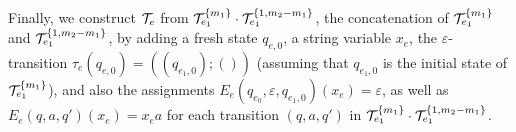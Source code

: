 Finally, we construct $\mathcal{T}_e$ from $\mathcal{T}^{\{m_1\}}_{e_1} \cdot \mathcal{T}^{\{1,m_2-m_1\}}_{e_1}$, the concatenation of $\mathcal{T}^{\{m_1\}}_{e_1}$ and $\mathcal{T}^{\{1,m_2-m_1\}}_{e_1}$, by adding a fresh state $q_{e,0}$, a string variable $x_e$, the $\varepsilon$-transition $\tau_e(q_{e,0}) = ((q_{e_1,0});())$ (assuming that $q_{e_1,0}$ is the initial state of $\mathcal{T}^{\{m_1\}}_{e_1}$),  and also the assignments $E_e(q_{e_0}, \varepsilon, q_{e_1,0})(x_e) = \varepsilon$, as well as $E_e(q, a, q')(x_e) = x_e a$ for each transition $(q, a, q')$ in  $\mathcal{T}^{\{m_1\}}_{e_1} \cdot \mathcal{T}^{\{1,m_2-m_1\}}_{e_1}$.

%
%		
%
% 

